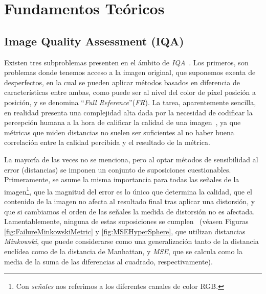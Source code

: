 \chapter{Fundamentos Teóricos}
\section{Image Quality Assessment (IQA)}
\label{sec:IQA}
Existen tres subproblemas presenten en el ámbito de \emph{IQA}~\cite{RecentIQASurvey, IQABook, VisualMedicalQualityBook}. Los primeros, son problemas 
donde tenemos acceso a la imagen original, que suponemos exenta de desperfectos, 
en la cual se pueden aplicar métodos basados en diferencia de características 
entre ambas, como puede ser al nivel del color de píxel posición a posición,
y se denomina ``\emph{Full Reference}''(\emph{FR}). 
La tarea, aparentemente sencilla, en realidad presenta una complejidad alta dada por 
la necesidad de codificar la percepción humana a la hora de calificar la calidad 
de una imagen~\cite{WhyIsIQASoDifficult}, ya que métricas que miden distancias no suelen 
ser suficientes al no haber buena correlación entre la calidad percibida y el 
resultado de la métrica.

La mayoría de las veces no se menciona, pero al optar métodos de sensibilidad 
al error (distancias) se imponen un conjunto de suposiciones cuestionables. 
Primeramente, se asume la misma importancia para todas las señales de la imagen\footnote{
  Con \emph{señales} nos referimos a los diferentes canales de color RGB.
}, que
la magnitud del error es lo único que determina la calidad, que el contenido de la imagen 
no afecta al resultado final tras aplicar una distorsión, y que si cambiamos el 
orden de las señales la medida de distorsión no es afectada.
Lamentablemente, ninguna de estas suposiciones se cumplen~\cite{Wang2006ModernIQ} (véasen Figuras \ref{fig:FailureMinkowskiMetric} y \ref{fig:MSEHyperSphere}, 
que utilizan distancias \emph{Minkowski}, 
que puede considerarse como una generalización tanto de 
la distancia euclídea como de la distancia de Manhattan, 
y \emph{MSE}, 
que se calcula como la media de la suma de las 
diferencias al cuadrado, respectivamente).


